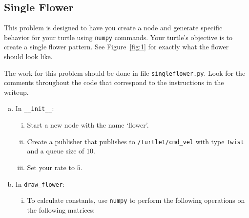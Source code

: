 \subsection{Single Flower}\label{p:single}

This problem is designed to have you create a node and generate specific behavior for your turtle
using \texttt{numpy} commands. Your turtle's objective is to create a single flower pattern. See
Figure~\ref{fig:1} for exactly what the flower should look like.

The work for this problem should be done in file \texttt{singleflower.py}. Look for the comments
throughout the code that correspond to the instructions in the writeup.

\begin{enumerate}[(a)]
  \item In \texttt{\_\_init\_\_}:
    \begin{enumerate}[i.]
      \item Start a new node with the name `flower'.
      \item Create a publisher that publishes to    \texttt{/turtle1/cmd\_vel} with type
        \texttt{Twist} and a queue size of $10$.
      \item Set your rate to $5$.
    \end{enumerate}
  \item In \texttt{draw\_flower}:
    \begin{enumerate}[i.]
      \item To calculate constants, use \texttt{numpy} to perform the following operations on the
        following matrices:


\end{enumerate}
\end{enumerate}
